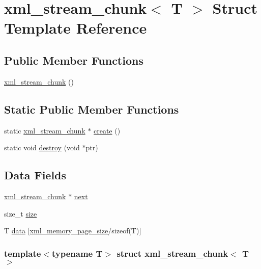 \hypertarget{structxml__stream__chunk}{
\section{xml\_\-stream\_\-chunk$<$ T $>$ Struct Template Reference}
\label{structxml__stream__chunk}
}
\subsection*{Public Member Functions}
\begin{DoxyCompactItemize}
\item 
\hyperlink{structxml__stream__chunk_a8b87fcb2074014dd252f752a95092337}{xml\_\-stream\_\-chunk} ()
\end{DoxyCompactItemize}
\subsection*{Static Public Member Functions}
\begin{DoxyCompactItemize}
\item 
static \hyperlink{structxml__stream__chunk}{xml\_\-stream\_\-chunk} $\ast$ \hyperlink{structxml__stream__chunk_a92cffe33c529ff266329fd4afb59226d}{create} ()
\item 
static void \hyperlink{structxml__stream__chunk_a4b812901d59950d48d539e5c8726a0e8}{destroy} (void $\ast$ptr)
\end{DoxyCompactItemize}
\subsection*{Data Fields}
\begin{DoxyCompactItemize}
\item 
\hyperlink{structxml__stream__chunk}{xml\_\-stream\_\-chunk} $\ast$ \hyperlink{structxml__stream__chunk_ad00071f7340adb2bde7c4157d4100b3c}{next}
\item 
size\_\-t \hyperlink{structxml__stream__chunk_a42618ba3b7bda1246cfc640149fc34eb}{size}
\item 
T \hyperlink{structxml__stream__chunk_a365e2e228a0277467b25a0fea42b8518}{data} \mbox{[}\hyperlink{pugixml_8cpp_aa040c77beb7349f7473f072b6dd364b9}{xml\_\-memory\_\-page\_\-size}/sizeof(T)\mbox{]}
\end{DoxyCompactItemize}
\subsubsection*{template$<$typename T$>$ struct xml\_\-stream\_\-chunk$<$ T $>$}



